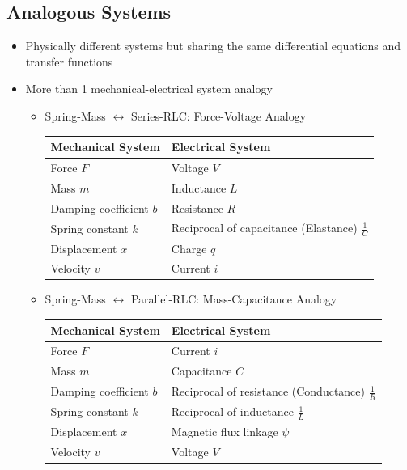\documentclass[a4paper]{article}
\begin{document}
\subsection{Analogous Systems}
\begin{itemize}
    \item Physically different systems but sharing the same differential equations and transfer functions
    \item More than 1 mechanical-electrical system analogy
    \begin{itemize}[label=$\circ$]
        \item Spring-Mass $\leftrightarrow$ Series-RLC: Force-Voltage Analogy
\begin{table}[H]
\centering\makegapedcells
\begin{tabular}{|l|l|}
\hline
\textbf{Mechanical System} & \textbf{Electrical System}                          \\ \hline
Force $F$                  & Voltage $V$                                         \\ \hline
Mass $m$                   & Inductance $L$                                      \\ \hline
Damping coefficient $b$    & Resistance $R$                                      \\ \hline
Spring constant $k$        & Reciprocal of capacitance (Elastance) $\displaystyle\frac{1}{C}$ \\ \hline
Displacement $x$           & Charge $q$                                          \\ \hline
Velocity $v$               & Current $i$                                         \\ \hline
\end{tabular}
\end{table}
        \item Spring-Mass $\leftrightarrow$ Parallel-RLC: Mass-Capacitance Analogy
\begin{table}[H]
\centering\makegapedcells
\begin{tabular}{|l|l|}
\hline
\textbf{Mechanical System} & \textbf{Electrical System}                           \\ \hline
Force $F$                  & Current $i$                                          \\ \hline
Mass $m$                   & Capacitance $C$                                      \\ \hline
Damping coefficient $b$    & Reciprocal of resistance (Conductance) $\displaystyle\frac{1}{R}$ \\ \hline
Spring constant $k$        & Reciprocal of inductance $\displaystyle\frac{1}{L}$               \\ \hline
Displacement $x$           & Magnetic flux linkage $\psi$                         \\ \hline
Velocity $v$               & Voltage $V$                                          \\ \hline
\end{tabular}
\end{table}
    \end{itemize}
\end{itemize}
\end{document}
